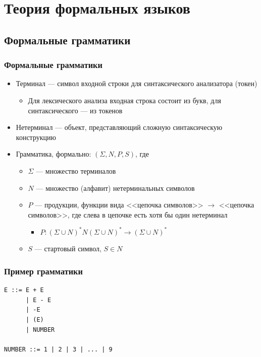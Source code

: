 \documentclass[xetex,mathserif,serif]{beamer}
\begin{document}
    \section{Теория формальных языков}

    \subsection{Формальные грамматики}

    \begin{frame}
        \frametitle{Формальные грамматики}
        \begin{itemize}
            \item Терминал --- символ входной строки для синтаксического анализатора (токен)
            \begin{itemize}
                \item Для лексического анализа входная строка состоит из букв, для синтаксического --- из токенов
            \end{itemize}
            \item Нетерминал --- объект, представляющий сложную синтаксическую конструкцию
            \item Грамматика, формально: $(\Sigma, N, P, S)$, где
            \begin{itemize}
                \item $\Sigma$ --- множество терминалов
                \item $N$ --- множество (алфавит) нетерминальных символов
                \item $P$ --- продукции, функции вида <<цепочка символов>> $\rightarrow$ <<цепочка символов>>, где слева в цепочке есть хотя бы один нетерминал
                \begin{itemize}
                    \item $P: (\Sigma \cup N)^* N (\Sigma \cup N)^* \rightarrow (\Sigma \cup N)^*$
                \end{itemize}
                \item $S$ --- стартовый символ, $S \in N$
            \end{itemize}
        \end{itemize}
    \end{frame}

    \begin{frame}[fragile]
        \frametitle{Пример грамматики}
        \begin{verbatim}
E ::= E + E
      | E - E
      | -E
      | (E)
      | NUMBER

NUMBER ::= 1 | 2 | 3 | ... | 9
        \end{verbatim}
    \end{frame}
\end{document}
